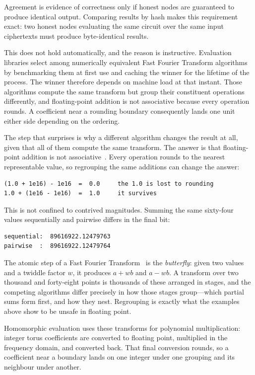 \documentclass[12pt,a4paper]{article}
\begin{document}
Agreement is evidence of correctness only if honest nodes are guaranteed to produce identical output.
Comparing results by hash makes this requirement exact: two honest nodes evaluating the same circuit over the same input ciphertexts must produce byte-identical results.

This does not hold automatically, and the reason is instructive.
Evaluation libraries select among numerically equivalent Fast Fourier Transform algorithms by benchmarking them at first use and caching the winner for the lifetime of the process.
The winner therefore depends on machine load at that instant.
Those algorithms compute the same transform but group their constituent operations differently, and floating-point addition is not associative because every operation rounds.
A coefficient near a rounding boundary consequently lands one unit either side depending on the ordering.

The step that surprises is why a different algorithm changes the result at all, given that all of them compute the same transform.
The answer is that floating-point addition is not associative~\cite{floating_point}.
Every operation rounds to the nearest representable value, so regrouping the same additions can change the answer:

\begin{verbatim}
(1.0 + 1e16) - 1e16  =  0.0     the 1.0 is lost to rounding
1.0 + (1e16 - 1e16)  =  1.0     it survives
\end{verbatim}

This is not confined to contrived magnitudes.
Summing the same sixty-four values sequentially and pairwise differs in the final bit:

\begin{verbatim}
sequential:  89616922.12479763
pairwise  :  89616922.12479764
\end{verbatim}

The atomic step of a Fast Fourier Transform~\cite{cooley_tukey} is the \emph{butterfly}: given two values and a twiddle factor $w$, it produces $a + wb$ and $a - wb$.
A transform over two thousand and forty-eight points is thousands of these arranged in stages, and the competing algorithms differ precisely in how those stages group---which partial sums form first, and how they nest.
Regrouping is exactly what the examples above show to be unsafe in floating point.

Homomorphic evaluation uses these transforms for polynomial multiplication: integer torus coefficients are converted to floating point, multiplied in the frequency domain, and converted back.
That final conversion rounds, so a coefficient near a boundary lands on one integer under one grouping and its neighbour under another.
\end{document}
